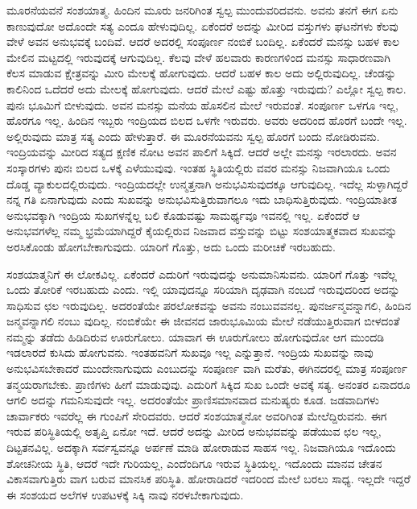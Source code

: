 ಮೂರನೆಯವನೆ ಸಂಶಯಾತ್ಮ. ಹಿಂದಿನ ಮೂರು ಜನರಿಗಿಂತ ಸ್ವಲ್ಪ ಮುಂದುವರಿದವನು. ಅವನು ತನಗೆ ಈಗ ಏನು ಕಾಣುವುದೋ ಅದೊಂದೇ ಸತ್ಯ ಎಂದೂ ಹೇಳುವುದಿಲ್ಲ. ಏಕೆಂದರೆ ಅದನ್ನು ಮೀರಿದ ವಸ್ತುಗಳು ಘಟನೆಗಳು ಕೆಲವು ವೇಳೆ ಅವನ ಅನುಭವಕ್ಕೆ ಬಂದಿವೆ. ಆದರೆ ಅದರಲ್ಲಿ ಸಂಪೂರ್ಣ ನಂಬಿಕೆ ಬಂದಿಲ್ಲ. ಏಕೆಂದರೆ ಮನಸ್ಸು ಬಹಳ ಕಾಲ ಮೇಲಿನ ಮಟ್ಟದಲ್ಲಿ ಇರುವುದಕ್ಕೆ ಆಗುವುದಿಲ್ಲ. ಕೆಲವು ವೇಳೆ ಹಲವಾರು ಕಾರಣಗಳಿಂದ ಮನಸ್ಸು ಸಾಧಾರಣವಾಗಿ ಕೆಲಸ ಮಾಡುವ ಕ್ಷೇತ್ರವನ್ನು ಮೀರಿ ಮೇಲಕ್ಕೆ ಹೋಗುವುದು. ಆದರೆ ಬಹಳ ಕಾಲ ಅದು ಅಲ್ಲಿರುವುದಿಲ್ಲ. ಚೆಂಡನ್ನು ಕಾಲಿನಿಂದ ಒದೆದರೆ ಅದು ಮೇಲಕ್ಕೆ ಹೋಗುವುದು. ಆದರೆ ಮೇಲೆ ಎಷ್ಟು ಹೊತ್ತು ಇರುವುದು? ಎಲ್ಲೋ ಸ್ವಲ್ಪ ಕಾಲ. ಪುನಃ ಭೂಮಿಗೆ ಬೀಳುವುದು. ಅವನ ಮನಸ್ಸು ಮನೆಯ ಹೊಸಲಿನ ಮೇಲೆ ಇರುವಂತೆ. ಸಂಪೂರ್ಣ ಒಳಗೂ ಇಲ್ಲ, ಹೊರಗೂ ಇಲ್ಲ. ಹಿಂದಿನ ಇಬ್ಬರು ಇಂದ್ರಿಯದ ಬಿಲದ ಒಳಗೇ ಇರುವರು. ಅವರು ಅದರಿಂದ ಹೊರಗೆ ಬಂದೇ ಇಲ್ಲ. ಅಲ್ಲಿರುವುದು ಮಾತ್ರ ಸತ್ಯ ಎಂದು ಹೇಳುತ್ತಾರೆ. ಈ ಮೂರನೆಯವನು ಸ್ವಲ್ಪ ಹೊರಗೆ ಬಂದು ನೋಡಿರುವನು. ಇಂದ್ರಿಯವನ್ನು ಮೀರಿದ ಸತ್ಯದ ಕ್ಷಣಿಕ ನೋಟ ಅವನ ಪಾಲಿಗೆ ಸಿಕ್ಕಿದೆ. ಆದರೆ ಅಲ್ಲೇ ಮನಸ್ಸು ಇರಲಾರದು. ಅವನ ಸಂಸ್ಕಾರಗಳು ಪುನಃ ಬಿಲದ ಒಳಕ್ಕೆ ಎಳೆಯುವುವು. ಇಂತಹ ಸ್ಥಿತಿಯಲ್ಲಿರು ವವರ ಮನಸ್ಸು ನಿಜವಾಗಿಯೂ ಒಂದು ದೊಡ್ಡ ವ್ಯಾಕುಲದಲ್ಲಿರುವುದು. ಇಂದ್ರಿಯದಲ್ಲೇ ಉನ್ಮತ್ತನಾಗಿ ಅನುಭವಿಸುವುದಕ್ಕೂ ಆಗುವುದಿಲ್ಲ. ಇದೆಲ್ಲ ಸುಳ್ಳಾಗಿದ್ದರೆ ನನ್ನ ಗತಿ ಏನಾಗುವುದು ಎಂದು ಸುಖವನ್ನು ಅನುಭವಿಸುತ್ತಿರುವಾಗಲೂ ಇದು ಬಾಧಿಸುತ್ತಿರುವುದು. ಇಂದ್ರಿಯಾತೀತ ಅನುಭವಕ್ಕಾಗಿ ಇಂದ್ರಿಯ ಸುಖಗಳನ್ನೆಲ್ಲ ಬಲಿ ಕೊಡುವಷ್ಟು ಸಾಮರ್ಥ್ಯವೂ ಇವನಲ್ಲಿ ಇಲ್ಲ. ಏಕೆಂದರೆ ಆ ಅನುಭವಗಳೆಲ್ಲ ನಮ್ಮ ಭ್ರಮೆಯಾಗಿದ್ದರೆ ಕೈಯಲ್ಲಿರುವ ನಿಜವಾದ ವಸ್ತುವನ್ನು ಬಿಟ್ಟು ಸಂಶಯಾತ್ಮಕವಾದ ಸುಖವನ್ನು ಅರಸಿಕೊಂಡು ಹೋಗಬೇಕಾಗುವುದು. ಯಾರಿಗೆ ಗೊತ್ತು, ಅದು ಒಂದು ಮರೀಚಿಕೆ ಇರಬಹುದು.

ಸಂಶಯಾತ್ಮನಿಗೆ ಈ ಲೋಕವಿಲ್ಲ. ಏಕೆಂದರೆ ಎದುರಿಗೆ ಇರುವುದನ್ನು ಅನುಮಾನಿಸುವನು. ಯಾರಿಗೆ ಗೊತ್ತು ಇವೆಲ್ಲ ಒಂದು ತೋರಿಕೆ ಇರಬಹುದು ಎಂದು. ಇಲ್ಲಿ ಯಾವುದನ್ನೂ ಸರಿಯಾಗಿ ದೃಢವಾಗಿ ನಂಬದೆ ಇರುವುದರಿಂದ ಅದನ್ನು ಸಾಧಿಸುವ ಛಲ ಇರುವುದಿಲ್ಲ. ಅದರಂತೆಯೇ ಪರಲೋಕವನ್ನು ಅವನು ನಂಬುವವನಲ್ಲ. ಪುನರ್ಜನ್ಮವನ್ನಾಗಲಿ, ಹಿಂದಿನ ಜನ್ಮವನ್ನಾಗಲಿ ನಂಬು ವುದಿಲ್ಲ. ನಂಬಿಕೆಯೇ ಈ ಜೀವನದ ಜಾರುಭೂಮಿಯ ಮೇಲೆ ನಡೆಯುತ್ತಿರುವಾಗ ಬೀಳದಂತೆ ನಮ್ಮನ್ನು ತಡೆದು ಹಿಡಿದಿರುವ ಊರುಗೋಲು. ಯಾವಾಗ ಈ ಊರುಗೋಲು ಹೋಗುವುದೋ ಆಗ ಮುಂದಡಿ ಇಡಲಾರದೆ ಕುಸಿದು ಹೋಗುವನು. ಇಂತಹವನಿಗೆ ಸುಖವೂ ಇಲ್ಲ ಎನ್ನುತ್ತಾನೆ. ಇಂದ್ರಿಯ ಸುಖವನ್ನು ನಾವು ಅನುಭವಿಸಬೇಕಾದರೆ ಮುಂದೇನಾಗುವುದು ಎಂಬುದನ್ನು ಸಂಪೂರ್ಣ ವಾಗಿ ಮರೆತು, ಈಗಿನದರಲ್ಲಿ ಮಾತ್ರ ಸಂಪೂರ್ಣ ತನ್ಮಯರಾಗಬೇಕು. ಪ್ರಾಣಿಗಳು ಹೀಗೆ ಮಾಡುವುವು. ಎದುರಿಗೆ ಸಿಕ್ಕಿದ ಸುಖ ಒಂದೇ ಅವಕ್ಕೆ ಸತ್ಯ. ಅನಂತರ ಏನಾದರೂ ಆಗಲಿ ಅದನ್ನು ಗಮನಿಸುವುದೇ ಇಲ್ಲ. ಅದರಂತೆಯೇ ಪ್ರಾಣಿಸಮಾನವಾದ ಮನುಷ್ಯರು ಕೂಡ. ಜಡವಾದಿಗಳು ಚಾರ್ವಾಕರು ಇವರೆಲ್ಲ ಈ ಗುಂಪಿಗೆ ಸೇರಿದವರು. ಆದರೆ ಸಂಶಯಾತ್ಮನೋ ಅವರಿಗಿಂತ ಮೇಲೆದ್ದಿರುವನು. ಈಗ ಇರುವ ಪರಿಸ್ಥಿತಿಯಲ್ಲಿ ಅತೃಪ್ತಿ ಏನೋ ಇದೆ. ಆದರೆ ಅದನ್ನು ಮೀರಿದ ಅನುಭವವನ್ನು ಪಡೆಯುವ ಛಲ ಇಲ್ಲ, ದಿಟ್ಟತನವಿಲ್ಲ. ಅದಕ್ಕಾಗಿ ಸರ್ವಸ್ವವನ್ನೂ ಅರ್ಪಣೆ ಮಾಡಿ ಹೋರಾಡುವ ಸಾಹಸ ಇಲ್ಲ. ನಿಜವಾಗಿಯೂ ಇದೊಂದು ಶೋಚನೀಯ ಸ್ಥಿತಿ, ಆದರೆ ಇದೇ ಗುರಿಯಲ್ಲ, ಎಂದೆಂದಿಗೂ ಇರುವ ಸ್ಥಿತಿಯಲ್ಲ. ಇದೊಂದು ಮಾನವ ಚೇತನ ವಿಕಾಸವಾಗುತ್ತಿರು ವಾಗ ಬರುವ ಮಾನಸಿಕ ಪರಿಸ್ಥಿತಿ. ಹೋರಾಡಿದರೆ ಇದರಿಂದ ಮೇಲೆ ಬರಲು ಸಾಧ್ಯ. ಇಲ್ಲದೇ ಇದ್ದರೆ ಈ ಸಂಶಯದ ಅಲೆಗಳ ಉಪಟಳಕ್ಕೆ ಸಿಕ್ಕಿ ನಾವು ನರಳಬೇಕಾಗುವುದು.

